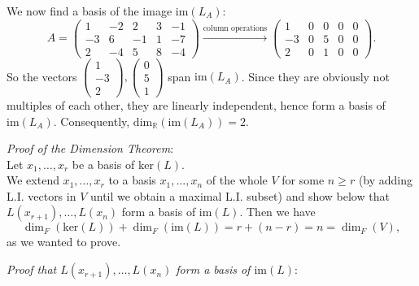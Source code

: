 \documentclass[
  12pt,
  a4paper,
  twoside]{article}
\theoremstyle{plain}
\theoremstyle{definition}
\begin{document}
We now find a basis of the image \(\mathrm{im}(L_A)\):
\[
A = \begin{pmatrix} 1&-2&2&3&-1\\ -3&6&-1&1&-7\\ 2&-4&5&8&-4\end{pmatrix}
\xrightarrow{\text{column operations}}
\begin{pmatrix} 1&0&0&0&0\\ -3&0&5&0&0\\ 2&0&1&0&0\end{pmatrix}.
\]
So the vectors \(\begin{pmatrix}1\\-3\\2\end{pmatrix}, \begin{pmatrix}0\\5\\1\end{pmatrix}\) span \(\mathrm{im}(L_A)\). Since they are obviously not multiples of each other, they are linearly independent, hence form a basis of \(\mathrm{im}(L_A)\). Consequently, \(\mathrm{dim}_{\mathbb{R}}(\mathrm{im}(L_A))=2\).

\emph{Proof of the Dimension Theorem}:\\
Let \(x_1,\dots,x_r\) be a basis of \(\mathrm{ker}(L)\).\\
We extend \(x_1,\dots,x_r\) to a basis \(x_1,\dots,x_n\) of the whole \(V\) for some \(n\geq r\) (by adding L.I. vectors in \(V\) until we obtain a maximal L.I. subset) and show below that \(L(x_{r+1}),\dots,L(x_{n})\) form a basis of \(\mathrm{im}(L)\). Then we have
\[
\dim_F(\mathrm{ker}(L)) + \dim_F(\mathrm{im}(L)) = r + (n-r) = n = \dim_F(V),
\]
as we wanted to prove.

\emph{Proof that \(L(x_{r+1}),\dots, L(x_n)\) form a basis of \(\mathrm{im}(L)\)}:
\end{document}
